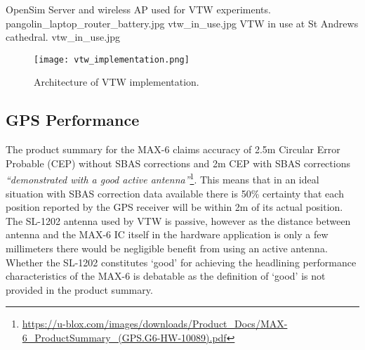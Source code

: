  {OpenSim Server and wireless AP used for VTW experiments.} {pangolin_laptop_router_battery.jpg}
       {vtw_in_use.jpg} {VTW in use at St Andrews cathedral.} {vtw_in_use.jpg}

\begin{figure}[h]
\centering
  \texttt{[image: vtw\_implementation.png]}
  \caption{Architecture of VTW implementation.}
  \label{vtw_implementation.png}
\end{figure}


\subsection{GPS Performance}

\newcommand{\ubloxcepFootnote}{\footnote{\url{https://u-blox.com/images/downloads/Product_Docs/MAX-6_ProductSummary_(GPS.G6-HW-10089).pdf}}}

\newcommand{\htconesFootnote}{\footnote{\url{http://www.htc.com/uk/smartphones/htc-one-s/}}}

\newcommand{\snapdragonFootnote}{\footnote{\url{https://www.qualcomm.com/products/snapdragon/processors/s4-s1}}}

\newcommand{\mytracksFootnote}{\footnote{\url{https://play.google.com/store/apps/details?id=com.google.android.maps.mytracks&hl=en}}}

\newcommand{\hausdorffFootnote}{\footnote{\url{http://postgis.net/docs/ST_HausdorffDistance.html}}}


The product summary for the MAX-6 claims accuracy of 2.5m Circular Error Probable (CEP) without SBAS corrections and 2m CEP with SBAS corrections \textit{``demonstrated with a good active antenna''}\ubloxcepFootnote{}. This means that in an ideal situation with SBAS correction data available there is 50\% certainty that each position reported by the GPS receiver will be within 2m of its actual position. The SL-1202 antenna used by VTW is passive, however as the distance between antenna and the MAX-6 IC itself in the hardware application is only a few millimeters there would be negligible benefit from using an active antenna. Whether the SL-1202 constitutes `good' for achieving the headlining performance characteristics of the MAX-6 is debatable as the definition of `good' is not provided in the product summary.


